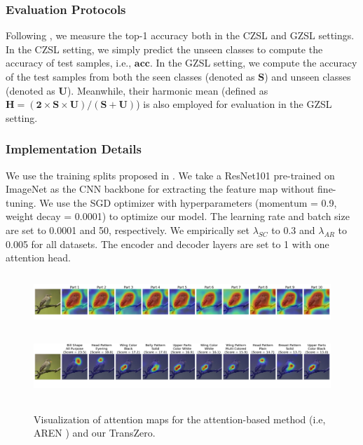 \documentclass[letterpaper]{article} %
\begin{document}
	\subsubsection{Evaluation Protocols}
	Following \cite{Xian2017ZeroShotLC}, we measure the top-1 accuracy both in the CZSL and GZSL settings. In the CZSL setting, we simply predict the unseen classes to compute the accuracy of test samples, i.e., $\bm{acc}$. In the GZSL setting,  we compute the accuracy of the test samples from both the seen classes (denoted as $\bm{S}$) and unseen classes (denoted as $\bm{U}$). Meanwhile, their harmonic mean (defined as $\bm{H =(2 \times S \times U) /(S+U)}$) is also employed for evaluation in the GZSL setting.
	
	\subsubsection{Implementation Details}
	We use the training splits proposed in \cite{Xian2018FeatureGN}. We take a ResNet101 pre-trained on ImageNet as the CNN backbone for extracting the feature map without fine-tuning. We use the SGD optimizer with hyperparameters (momentum = 0.9, weight decay = 0.0001) to optimize our model. The learning rate and batch size are set to 0.0001 and 50, respectively. We empirically set $\lambda_{SC}$ to 0.3 and $\lambda_{AR}$ to 0.005 for all datasets. The encoder and decoder layers are set to 1 with one attention head.
	
	\begin{figure}[t]
		\begin{center}
			\hspace{0.5mm}\hspace{-1mm}
			\includegraphics[width=17cm,height=2.05cm]{./figures/attention-map-AREN.jpg}\\\vspace{-2mm}
			\hspace{0.5mm}\hspace{-1mm}
			\includegraphics[width=17cm,height=2.55cm]{./figures/attention-map-TransZero.jpg}\\\vspace{-7mm}
			\caption{Visualization of attention maps for the attention-based method (i.e, AREN \cite{Xie2019AttentiveRE}) and our TransZero.}
			\label{fig:attened-part}\vspace{-6mm}
		\end{center}
	\end{figure}
	
\end{document}
